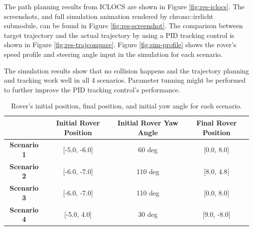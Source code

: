 \documentclass{article}
\begin{document}
The path planning results from ICLOCS are shown in Figure \ref{fig:res-iclocs}. The screenshots, and full simulation animation rendered by chrono::irrlicht submodule, can be found in Figure \ref{fig:res-screenshot}. The comparison between target trajectory and the actual trajectory by using a PID tracking control is shown in Figure \ref{fig:res-trajcompare}. Figure \ref{fig:sim-profile} shows the rover's speed profile and steering angle input in the simulation for each scenario. 

The simulation results show that no collision happens and the trajectory planning and tracking work well in all 4 scenarios. Parameter tunning might be performed to further improve the PID tracking control's performance. 

\begin{table}[]
	\centering
	\begin{tabular}{|c|c|c|c|}
		\hline
		& \textbf{Initial Rover Position} & \textbf{Initial Rover Yaw Angle} & \textbf{Final Rover Position} \\ \hline
		\textbf{Scenario 1} & {[}-5.0, -6.0{]}                & 60 deg                           & {[}0.0, 8.0{]}                \\ \hline
		\textbf{Scenario 2} & {[}-6.0, -7.0{]}                & 110 deg                          & {[}8.0, 4.8{]}                \\ \hline
		\textbf{Scenario 3} & {[}-6.0, -7.0{]}                & 110 deg                          & {[}0.0, 8.0{]}                \\ \hline
		\textbf{Scenario 4} & {[}-5.0, 4.0{]}                 & 30 deg                           & {[}9.0, -8.0{]}               \\ \hline
	\end{tabular}
	\caption{Rover's initial position, final position, and initial yaw angle for each scenario.}
	\label{tab:sce_setup}
\end{table}
\end{document}
